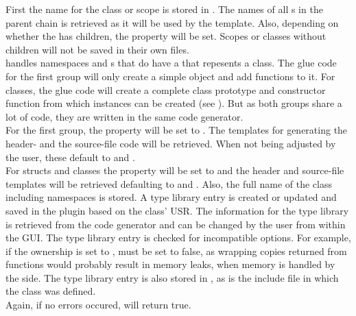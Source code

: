 First the name for the class or scope is stored in . The names of all \linebreak{}s in the parent chain is retrieved as it will be used by the template. Also, depending on whether the  has children, the  property will be set. Scopes or classes without children will not be saved in their own files.\\
 handles namespaces and s that do have a \linebreak{} that repesents a  class. The glue code for the first group will only create a simple  object and add functions to it. For classes, the glue code will create a complete  class prototype and constructor function from which instances can be created (see ). But as both groups share a lot of code, they are written in the same code generator.\\
For the first group, the  property will be set to . The templates for generating the header- and the source-file code will be retrieved. When not being adjusted by the user, these default to  and .\\
For structs and classes the  property will be set to  and the header and source-file templates will be retrieved defaulting to  and . Also, the full name of the class including namespaces is stored. A type library entry is created or updated and saved in the plugin based on the class' USR. The information for the type library is retrieved from the code generator and can be changed by the user from within the GUI. The type library entry is checked for incompatible options. For example, if the ownership is set to ,  must be set to false, as wrapping copies returned from  functions would probably result in memory leaks, when memory is handled by the  side. The type library entry is also stored in , as is the include file in which the class was defined.\\
Again, if no errors occured,  will return true.

